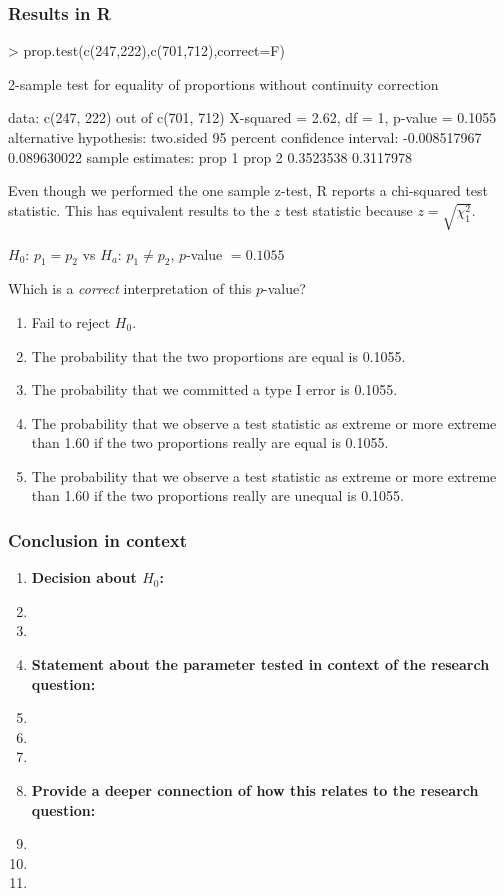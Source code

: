 \begin{frame}[fragile]
\frametitle{Results in R}
\begin{lcverbatim}
> prop.test(c(247,222),c(701,712),correct=F)

	2-sample test for equality of proportions without continuity correction

data:  c(247, 222) out of c(701, 712)
X-squared = 2.62, df = 1, p-value = 0.1055
alternative hypothesis: two.sided
95 percent confidence interval:
 -0.008517967  0.089630022
sample estimates:
   prop 1    prop 2
0.3523538 0.3117978
\end{lcverbatim}
Even though we performed the one sample z-test, R reports a chi-squared test statistic.  This has equivalent results to the $z$ test statistic because $z=\sqrt{\chi^2_1}$.
\end{frame}

\begin{frame}
$H_0$: $p_1=p_2$ vs $H_a$: $p_1 \neq p_2$, $p$-value $=0.1055$
\begin{clicker}{Which is a \emph{correct} interpretation of this $p$-value?}
\begin{enumerate}
    \item
    Fail to reject $H_0$.
    \item
    The probability that the two proportions are equal is 0.1055.
    \item
    The probability that we committed a type I error is 0.1055.
    \item
    The probability that we observe a test statistic as extreme or more extreme than 1.60 if the two proportions really are equal is  0.1055.
    \item
    The probability that we observe a test statistic as extreme or more extreme than 1.60 if the two proportions really are unequal is  0.1055.
\end{enumerate}
\end{clicker}
\end{frame}

\begin{frame}
\frametitle{Conclusion in context}
\begin{enumerate}
    \item \textbf{Decision about $H_0$:}
    \item[]
    \item[]
    \item \textbf{Statement about the parameter tested in context of the research question:}
    \item[]
    \item[]
    \item[]
    \item \textbf{Provide a deeper connection of how this relates to the research question:}
    \item[]
    \item[]
    \item[]
\end{enumerate}
\end{frame}

